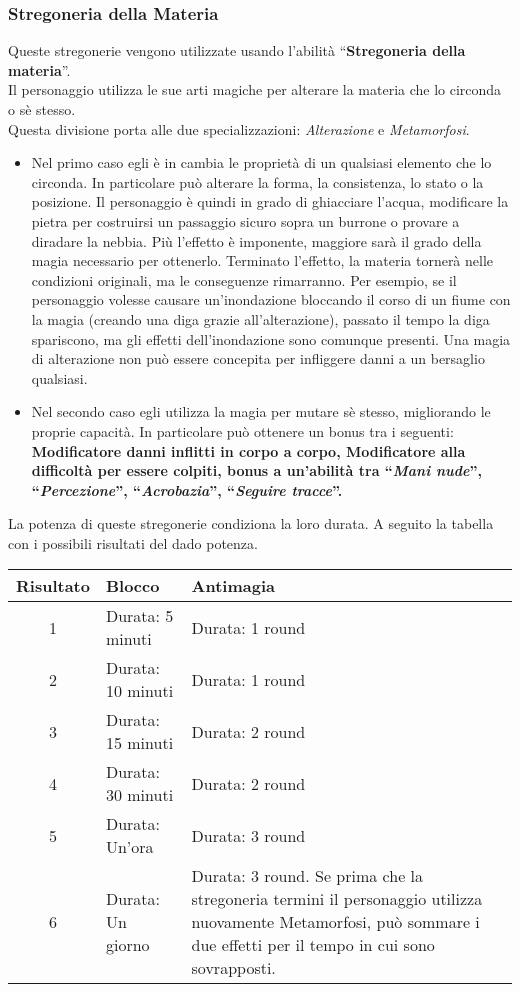 \documentclass[../manuale_main.tex]{subfiles}
\begin{document}
\subsubsection{Stregoneria della Materia}
Queste stregonerie vengono utilizzate usando l'abilità ``\textbf{Stregoneria della materia}''.\\
Il personaggio utilizza le sue arti magiche per alterare la materia che lo circonda o sè stesso. \\
Questa divisione porta alle due specializzazioni: \emph{Alterazione} e \emph{Metamorfosi}.\\
\begin{itemize}
\item Nel primo caso egli è in cambia le proprietà di un qualsiasi elemento che lo circonda. In particolare può alterare la forma, la consistenza, lo stato o la posizione. Il personaggio è quindi in grado di ghiacciare l'acqua, modificare la pietra per costruirsi un passaggio sicuro sopra un burrone o provare a diradare la nebbia. Più l'effetto è imponente, maggiore sarà il grado della magia necessario per ottenerlo. Terminato l'effetto, la materia tornerà nelle condizioni originali, ma le conseguenze rimarranno. Per esempio, se il personaggio volesse causare un'inondazione bloccando il corso di un fiume con la magia (creando una diga grazie all'alterazione), passato il tempo la diga spariscono, ma gli effetti dell'inondazione sono comunque presenti. Una magia di alterazione non può essere concepita per infliggere danni a un bersaglio qualsiasi.
\item Nel secondo caso egli utilizza la magia per mutare sè stesso, migliorando le proprie capacità. In particolare può ottenere un bonus tra i seguenti: \textbf{Modificatore danni inflitti in corpo a corpo, Modificatore alla difficoltà per essere colpiti, bonus a un'abilità tra ``\emph{Mani nude}'', ``\emph{Percezione}'', ``\emph{Acrobazia}'', ``\emph{Seguire tracce}''.}
\end{itemize}
La potenza di queste stregonerie condiziona la loro durata. A seguito la tabella con i possibili risultati del dado potenza.\\

\begin{tabularx}{\linewidth}{|c |X| X|}
\hline
\textbf{Risultato}&\textbf{Blocco}&\textbf{Antimagia}\\ \hline
1&Durata: 5 minuti&Durata: 1 round\\ \hline
2&Durata: 10 minuti&Durata: 1 round\\ \hline
3&Durata: 15 minuti&Durata: 2 round\\ \hline
4&Durata: 30 minuti&Durata: 2 round\\ \hline
5&Durata: Un'ora&Durata: 3 round\\ \hline
6&Durata: Un giorno&Durata: 3 round. Se prima che la stregoneria termini il personaggio utilizza nuovamente Metamorfosi, può sommare i due effetti per il tempo in cui sono sovrapposti.\\ \hline
\end{tabularx}
\end{document}
